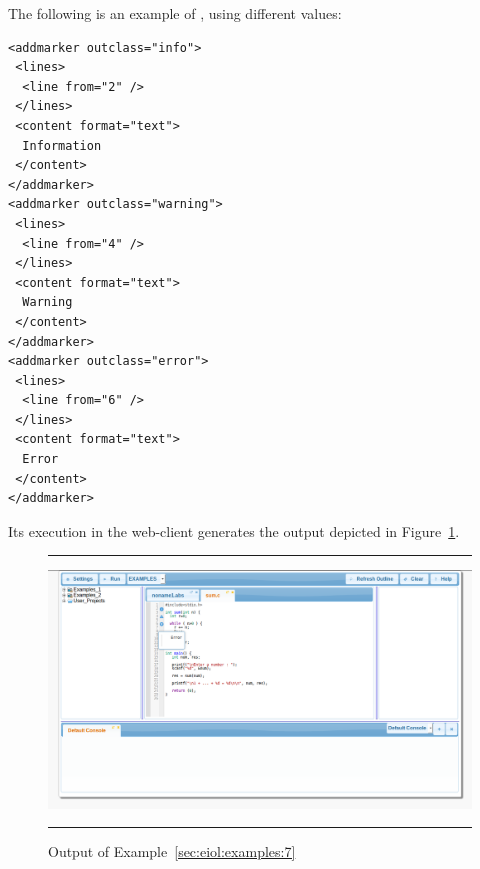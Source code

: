\begin{example}
\label{sec:eiol:examples:7}
%
The following is an example of ,
using different  values:

\medskip
\begin{lstlisting}
<addmarker outclass="info">
 <lines>
  <line from="2" />
 </lines>
 <content format="text">
  Information
 </content>
</addmarker>
<addmarker outclass="warning">
 <lines>
  <line from="4" />
 </lines>
 <content format="text">
  Warning
 </content>
</addmarker>
<addmarker outclass="error">
 <lines>
  <line from="6" />
 </lines>
 <content format="text">
  Error
 </content>
</addmarker>
\end{lstlisting}

\medskip
\noindent
Its execution in the web-client generates the output depicted in
Figure~\ref{fig:examples:7}.

\begin{figure}[h]
\hrule\smallskip
\begin{center}
\includegraphics[width=1\textwidth]{fig/example7.png}
\end{center}
\caption{Output of Example~\ref{sec:eiol:examples:7}}
\label{fig:examples:7}
\hrule
\end{figure}
\end{example}

